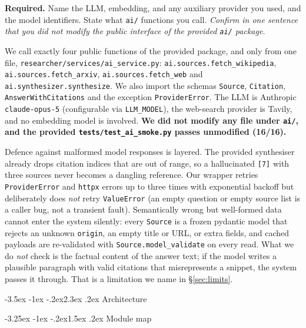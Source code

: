 \documentclass[11pt,a4paper]{article}
\makeatletter
\renewcommand\section{\@startsection{section}{1}{\z@}%
    {-3.5ex \@plus -1ex \@minus -.2ex}{2.3ex \@plus .2ex}%
    {\normalfont\Large\bfseries\color{accent}}}%
\renewcommand\subsection{\@startsection{subsection}{2}{\z@}%
    {-3.25ex \@plus -1ex \@minus -.2ex}{1.5ex \@plus .2ex}%
    {\normalfont\large\bfseries\color{accent}}}%
\makeatother
\begin{document}
\begin{deliverbox}
\textbf{Required.} Name the LLM, embedding, and any auxiliary provider you used, and the model identifiers. State what \texttt{ai/} functions you call. \emph{Confirm in one sentence that you did not modify the public interface of the provided \texttt{ai/} package.}
\end{deliverbox}

We call exactly four public functions of the provided package, and only from one file, \texttt{researcher/services/ai\_service.py}: \texttt{ai.sources.fetch\_wikipedia}, \texttt{ai.sources.fetch\_arxiv}, \texttt{ai.sources.fetch\_web} and \texttt{ai.synthesizer.synthesize}. We also import the schemas \texttt{Source}, \texttt{Citation}, \texttt{AnswerWithCitations} and the exception \texttt{ProviderError}. The LLM is Anthropic \texttt{claude-opus-5} (configurable via \texttt{LLM\_MODEL}), the web-search provider is Tavily, and no embedding model is involved. \textbf{We did not modify any file under \texttt{ai/}, and the provided \texttt{tests/test\_ai\_smoke.py} passes unmodified (16/16).}

Defence against malformed model responses is layered. The provided synthesiser already drops citation indices that are out of range, so a hallucinated \texttt{[7]} with three sources never becomes a dangling reference. Our wrapper retries \texttt{ProviderError} and \texttt{httpx} errors up to three times with exponential backoff but deliberately does \emph{not} retry \texttt{ValueError} (an empty question or empty source list is a caller bug, not a transient fault). Semantically wrong but well-formed data cannot enter the system silently: every \texttt{Source} is a frozen pydantic model that rejects an unknown \texttt{origin}, an empty title or URL, or extra fields, and cached payloads are re-validated with \texttt{Source.model\_validate} on every read. What we do \emph{not} check is the factual content of the answer text; if the model writes a plausible paragraph with valid citations that misrepresents a snippet, the system passes it through. That is a limitation we name in \S\ref{sec:limits}.

\section{Architecture}\label{sec:arch}

\subsection{Module map}
\end{document}
